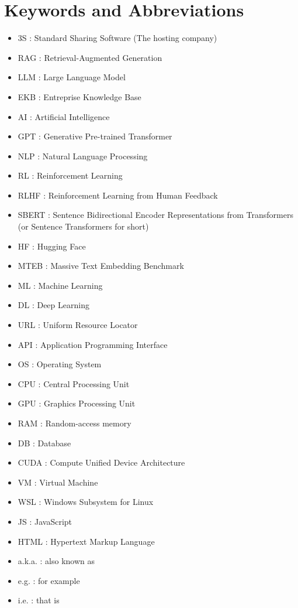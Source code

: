 \chapter*{Keywords and Abbreviations}
\begin{itemize}
    \item 3S : Standard Sharing Software (The hosting company)
    \item RAG : Retrieval-Augmented Generation
    \item LLM : Large Language Model
    \item EKB : Entreprise Knowledge Base
    \item AI : Artificial Intelligence
    \item GPT : Generative Pre-trained Transformer
    \item NLP : Natural Language Processing
    \item RL : Reinforcement Learning
    \item RLHF : Reinforcement Learning from Human Feedback
    \item SBERT : Sentence Bidirectional Encoder Representations from Transformers (or Sentence Transformers for short)
    \item HF : Hugging Face
    \item MTEB : Massive Text Embedding Benchmark
    \item ML : Machine Learning
    \item DL : Deep Learning
    \item URL : Uniform Resource Locator
    \item API : Application Programming Interface
    \item OS : Operating System
    \item CPU : Central Processing Unit
    \item GPU : Graphics Processing Unit
    \item RAM : Random-access memory
    \item DB : Database
    \item CUDA : Compute Unified Device Architecture
    \item VM : Virtual Machine
    \item WSL : Windows Subsystem for Linux
    \item JS : JavaScript
    \item HTML : Hypertext Markup Language
    \item a.k.a. : also known as
    \item e.g. : for example
    \item i.e. : that is
\end{itemize}